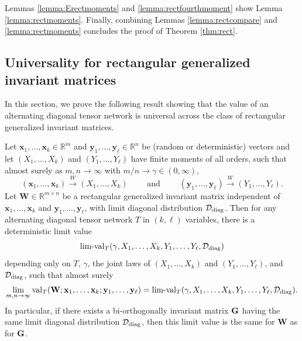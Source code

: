 \documentclass[10pt,reqno]{amsart}
\def\x{\mathbf{x}}
\def\y{\mathbf{y}}
\def\W{\mathbf{W}}
\def\R{\mathbb{R}}
\def\val{\operatorname{val}}
\def\limval{\operatorname{lim-val}}
\def\toW{\overset{W}{\to}}
\def\bW{{\mathbf{W}}}
\newcommand{\tdiag}{\mathrm{diag}}
\begin{document}
Lemmas \ref{lemma:Erectmoments} and \ref{lemma:rectfourthmoment} show Lemma
\ref{lemma:rectmoments}. Finally, combining Lemmas \ref{lemma:rectcompare} 
and \ref{lemma:rectmoments} concludes the proof of Theorem \ref{thm:rect}.


\subsection{Universality for rectangular generalized invariant
matrices}\label{subsec:rectinv}

In this section, we prove the following result showing that the value of an
alternating diagonal tensor network is universal across the class of rectangular
generalized invariant matrices.

\begin{lemma}\label{lemma:rectinvmoments}
Let $\x_1,\ldots,\x_k \in \R^m$ and $\y_1,\ldots,\y_\ell \in \R^n$ be (random or
deterministic) vectors and let $(X_1,\ldots,X_k)$ and $(Y_1,\ldots,Y_\ell)$ have
finite moments of all orders, such that almost surely as
$m,n \to \infty$ with $m/n \to \gamma \in (0,\infty)$,
\[(\x_1,\ldots,\x_k) \toW (X_1,\ldots,X_k) \qquad
\text{ and } \qquad (\y_1,\ldots,\y_\ell) \toW (Y_1,\ldots,Y_\ell).\]
Let $\W \in \R^{m \times n}$ be a rectangular generalized invariant
matrix independent of $\x_1,\ldots,\x_k$ and $\y_1,\ldots,\y_\ell$,
with limit diagonal distribution $\cD_\tdiag$.
Then for any alternating
diagonal tensor network $T$ in $(k,\ell)$ variables, there is a deterministic
limit value
\[\limval_T(\gamma,X_1,\ldots,X_k,Y_1,\ldots,Y_\ell,\cD_\tdiag)\]
depending only on $T$, $\gamma$, the joint laws of $(X_1,\ldots,X_k)$ and
$(Y_1,\ldots,Y_\ell)$, and $\cD_\tdiag$, such that almost surely
\[\lim_{m,n \to \infty} \val_T(\W;\x_1,\ldots,\x_k;\y_1,\ldots,\y_\ell)
=\limval_T(\gamma, X_1,\ldots,X_k,Y_1,\ldots,Y_\ell,\cD_\tdiag).\]
In particular, if there exists a bi-orthogonally invariant matrix $\mathbf{G}$
having the same limit diagonal distribution $\cD_\tdiag$, then this 
limit value is the same for $\bW$ as for $\mathbf{G}$.
\end{lemma}
\end{document}

